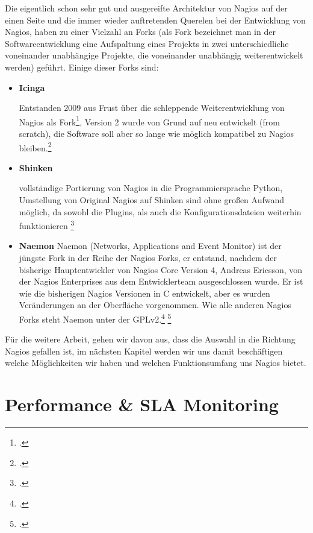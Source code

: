 \documentclass[12pt,a4paper,parskip,listof=totoc,bibliography=totoc]{scrreprt}
\begin{document}
	Die eigentlich schon sehr gut und ausgereifte Architektur von Nagios auf der einen Seite und die immer wieder auftretenden Querelen bei der Entwicklung von Nagios, haben zu einer Vielzahl an Forks (als Fork bezeichnet man in der Softwareentwicklung eine Aufspaltung eines Projekts in zwei unterschiedliche voneinander unabhängige Projekte, die voneinander unabhängig weiterentwickelt werden) geführt. 
	Einige dieser Forks sind:
	\begin{itemize}
		\item \textbf{Icinga} 
		
		Entstanden 2009 aus Frust über die schleppende Weiterentwicklung von Nagios als Fork\footcite{icingaabspaltung}, Version 2 wurde von Grund auf neu entwickelt (\glqq from scratch\grqq), die Software soll aber so lange wie möglich kompatibel zu Nagios bleiben.\footcite{icingafaq}
		\item \textbf{Shinken}
		
		vollständige Portierung von Nagios in die Programmiersprache Python, Umstellung von Original Nagios auf Shinken sind ohne großen Aufwand möglich, da sowohl die Plugins, als auch die Konfigurationsdateien weiterhin funktionieren \footcite{shinkenabout}
		\item \textbf{Naemon}
		Naemon (Networks, Applications and Event Monitor) ist der jüngste Fork in der Reihe der Nagios Forks, er entstand, nachdem der bisherige Hauptentwickler von Nagios Core Version 4, Andreas Ericsson, von der Nagios Enterprises aus dem Entwicklerteam ausgeschlossen wurde. Er ist wie die bisherigen Nagios Versionen in C entwickelt, aber es wurden Veränderungen an der Oberfläche vorgenommen. Wie alle anderen Nagios Forks steht Naemon unter der GPLv2.\footcite{naemon} \footcite[S. 19]{jungabschiednagios}
	\end{itemize} Für die weitere Arbeit, gehen wir davon aus, dass die Auswahl in die Richtung Nagios gefallen ist, im nächsten Kapitel werden wir uns damit beschäftigen welche Möglichkeiten wir haben und welchen Funktionsumfang uns Nagios bietet.
	
	
	\section{Performance \& SLA Monitoring}
\end{document}
